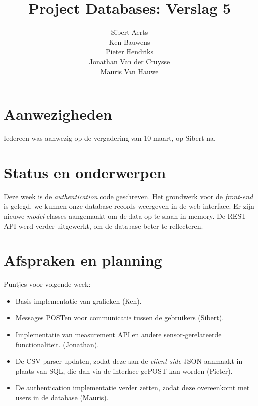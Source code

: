 \documentclass[10pt,a4paper]{article}
\author{Sibert Aerts\\
Ken Bauwens\\
Pieter Hendriks\\
Jonathan Van der Cruysse\\
Mauris Van Hauwe}
\title{Project Databases: Verslag 5}
\date{}
\begin{document}
  \maketitle
  \section{Aanwezigheden}
  Iedereen was aanwezig op de vergadering van 10 maart, op Sibert na.
  
  \section{Status en onderwerpen}
  Deze week is de \emph{authentication} code geschreven. 
  Het grondwerk voor de \emph{front-end} is gelegd, we kunnen onze database records weergeven in de web interface.
  Er zijn nieuwe \emph{model} classes aangemaakt om de data op te slaan in memory.
  De REST API werd verder uitgewerkt, om de database beter te reflecteren.
  
  \section{Afspraken en planning}
  Puntjes voor volgende week:
  \begin{itemize}
    
    \item Basis implementatie van grafieken (Ken).
    
    \item Messages POSTen voor communicatie tussen de gebruikers (Sibert).
    
    \item Implementatie van measurement API en andere sensor-gerelateerde functionaliteit. (Jonathan).
    
    \item De CSV parser updaten, zodat deze aan de \emph{client-side} JSON aanmaakt in plaats van SQL, die dan via de interface gePOST kan worden (Pieter).
    
    \item De authentication implementatie verder zetten, zodat deze overeenkomt met users in de database (Mauris).
  \end{itemize}
\end{document}

